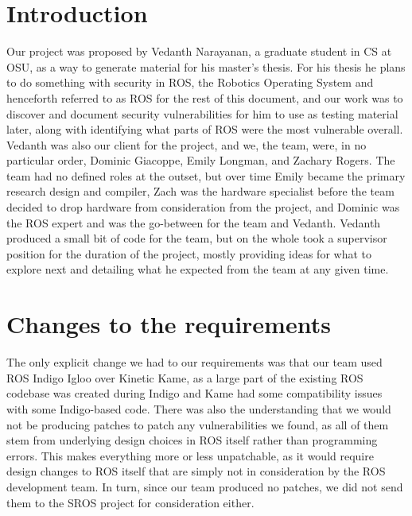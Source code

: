 \documentclass[IEEEtran,letterpaper,10pt,notitlepage,draftclsnofoot,onecolumn]{article}
\begin{document}
\section{Introduction}
Our project was proposed by Vedanth Narayanan, a graduate student in CS at 
OSU, as a way to generate material for his master’s thesis. For his thesis 
he plans to do something with security in ROS, the Robotics Operating System 
and henceforth referred to as ROS for the rest of this document, and our 
work was to discover and document security vulnerabilities for him to use as 
testing material later, along with identifying what parts of ROS were the most 
vulnerable overall. Vedanth was also our client for the project, and we, the team, 
were, in no particular order, Dominic Giacoppe, Emily Longman, and Zachary Rogers. 
The team had no defined roles at the outset, but over time Emily became the primary 
research design and compiler, Zach was the hardware specialist before the team 
decided to drop hardware from consideration from the project, and Dominic was the 
ROS expert and was the go-between for the team and Vedanth. Vedanth produced a 
small bit of code for the team, but on the whole took a supervisor position for 
the duration of the project, mostly providing ideas for what to explore next 
and detailing what he expected from the team at any given time. 
\newpage
\section{Changes to the requirements}
The only explicit change we had to our requirements was that our team used 
ROS Indigo Igloo over Kinetic Kame, as a large part of the existing ROS codebase
was created during Indigo and Kame had some compatibility issues with some 
Indigo-based code. There was also the understanding that we would not be 
producing patches to patch any vulnerabilities we found, as all of them
stem from underlying design choices in ROS itself rather than programming
errors. This makes everything more or less unpatchable, as it would require
design changes to ROS itself that are simply not in consideration by the 
ROS development team. In turn, since our team produced no patches, we did 
not send them to the SROS project for consideration either.
\newpage
\end{document}

